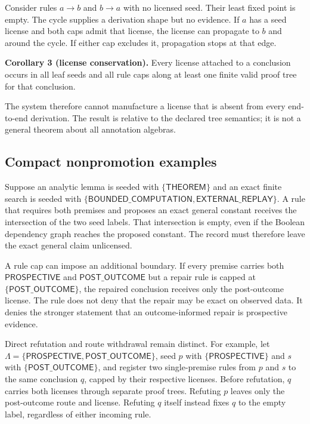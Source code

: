 \documentclass[pdflatex,sn-mathphys-num]{sn-jnl}
\begin{document}
Consider rules \(a\rightarrow b\) and \(b\rightarrow a\) with no licensed seed. Their least fixed point is empty. The cycle supplies a derivation shape but no evidence. If \(a\) has a seed license and both caps admit that license, the license can propagate to \(b\) and around the cycle. If either cap excludes it, propagation stops at that edge.

\textbf{Corollary 3 (license conservation).} Every license attached to a conclusion occurs in all leaf seeds and all rule caps along at least one finite valid proof tree for that conclusion.

The system therefore cannot manufacture a license that is absent from every end-to-end derivation. The result is relative to the declared tree semantics; it is not a general theorem about all annotation algebras.

\subsection{Compact nonpromotion examples}\label{compact-nonpromotion-examples}

Suppose an analytic lemma is seeded with \(\{\textsf{THEOREM}\}\) and an exact finite search is seeded with \(\{\textsf{BOUNDED\_COMPUTATION},\textsf{EXTERNAL\_REPLAY}\}\). A rule that requires both premises and proposes an exact general constant receives the intersection of the two seed labels. That intersection is empty, even if the Boolean dependency graph reaches the proposed constant. The record must therefore leave the exact general claim unlicensed.

A rule cap can impose an additional boundary. If every premise carries both \(\textsf{PROSPECTIVE}\) and \(\textsf{POST\_OUTCOME}\) but a repair rule is capped at \(\{\textsf{POST\_OUTCOME}\}\), the repaired conclusion receives only the post-outcome license. The rule does not deny that the repair may be exact on observed data. It denies the stronger statement that an outcome-informed repair is prospective evidence.

Direct refutation and route withdrawal remain distinct. For example, let \(\Lambda=\{\textsf{PROSPECTIVE},\textsf{POST\_OUTCOME}\}\), seed \(p\) with \(\{\textsf{PROSPECTIVE}\}\) and \(s\) with \(\{\textsf{POST\_OUTCOME}\}\), and register two single-premise rules from \(p\) and \(s\) to the same conclusion \(q\), capped by their respective licenses. Before refutation, \(q\) carries both licenses through separate proof trees. Refuting \(p\) leaves only the post-outcome route and license. Refuting \(q\) itself instead fixes \(q\) to the empty label, regardless of either incoming rule.
\end{document}

